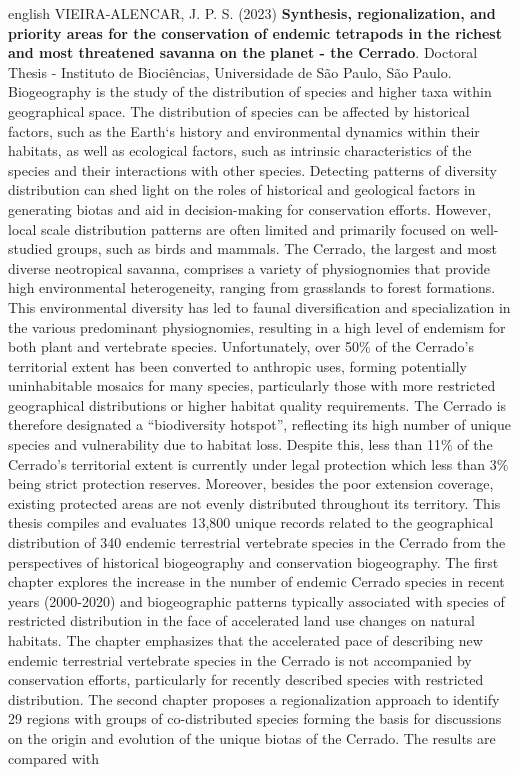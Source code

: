 \documentclass[12pt,openright,oneside,a4paper,english]{abntex2}
\begin{document}
\begin{resumo}[Abstract]
	\begin{otherlanguage*}{english}
		VIEIRA-ALENCAR, J. P. S. (2023) \textbf{Synthesis, regionalization, and priority areas for the conservation of endemic tetrapods in the richest and most threatened savanna on the planet - the Cerrado}. Doctoral Thesis - Instituto de Biociências, Universidade de São Paulo, São Paulo.\\
		
		Biogeography is the study of the distribution of species and higher taxa within geographical space. The distribution of species can be affected by historical factors, such as the Earth‘s history and environmental dynamics within their habitats, as well as ecological factors, such as intrinsic characteristics of the species and their interactions with other species. Detecting patterns of diversity distribution can shed light on the roles of historical and geological factors in generating biotas and aid in decision-making for conservation efforts. However, local scale distribution patterns are often limited and primarily focused on well-studied groups, such as birds and mammals. The Cerrado, the largest and most diverse neotropical savanna, comprises a variety of physiognomies that provide high environmental heterogeneity, ranging from grasslands to forest formations. This environmental diversity has led to faunal diversification and specialization in the various predominant physiognomies, resulting in a high level of endemism for both plant and vertebrate species. Unfortunately, over 50\% of the Cerrado’s territorial extent has been converted to anthropic uses, forming potentially uninhabitable mosaics for many species, particularly those with more restricted geographical distributions or higher habitat quality requirements. The Cerrado is therefore designated a “biodiversity hotspot”, reflecting its high number of unique species and vulnerability due to habitat loss. Despite this, less than 11\% of the Cerrado’s territorial extent is currently under legal protection which less than 3\% being strict protection reserves. Moreover, besides the poor extension coverage, existing protected areas are not evenly distributed throughout its territory. This thesis compiles and evaluates 13,800 unique records related to the geographical distribution of 340 endemic terrestrial vertebrate species in the Cerrado from the perspectives of historical biogeography and conservation biogeography. The first chapter explores the increase in the number of endemic Cerrado species in recent years (2000-2020) and biogeographic patterns typically associated with species of restricted distribution in the face of accelerated land use changes on natural habitats. The chapter emphasizes that the accelerated pace of describing new endemic terrestrial vertebrate species in the Cerrado is not accompanied by conservation efforts, particularly for recently described species with restricted distribution. The second chapter proposes a regionalization approach to identify 29 regions with groups of co-distributed species forming the basis for discussions on the origin and evolution of the unique biotas of the Cerrado. The results are compared with 
\end{otherlanguage*}
\end{resumo}
\end{document}

